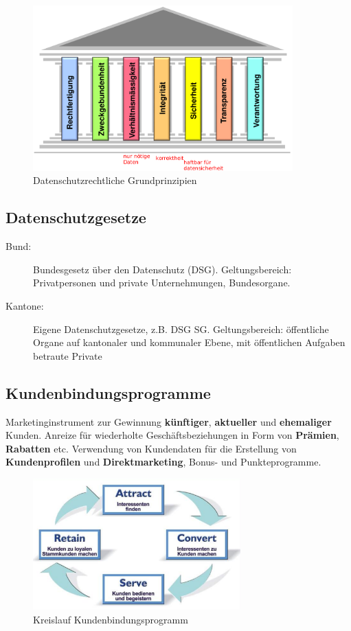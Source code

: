 \begin{figure}[H]
  \centering
  \includegraphics[width=10cm]{res/datenschutz-grundprinzipien.png}
  \caption{Datenschutzrechtliche Grundprinzipien}
\end{figure}

\subsection{Datenschutzgesetze}

\begin{description}
  \item[Bund:] Bundesgesetz über den Datenschutz (DSG). Geltungsbereich: Privatpersonen und private Unternehmungen, Bundesorgane.
  \item[Kantone:] Eigene Datenschutzgesetze, z.B. DSG SG. Geltungsbereich: öffentliche Organe auf kantonaler und kommunaler Ebene, mit öffentlichen Aufgaben betraute Private 
\end{description}

\subsection{Kundenbindungsprogramme}

Marketinginstrument zur Gewinnung \textbf{künftiger}, \textbf{aktueller} und \textbf{ehemaliger} Kunden. 
Anreize für wiederholte Geschäftsbeziehungen in Form von \textbf{Prämien}, \textbf{Rabatten} etc.
Verwendung von Kundendaten für die Erstellung von \textbf{Kundenprofilen} und \textbf{Direktmarketing}, Bonus- und Punkteprogramme.

\begin{figure}[H]
  \centering
  \includegraphics[width=8cm]{res/kundenbindung-kreislsauf.png}
  \caption{Kreislauf Kundenbindungsprogramm}
\end{figure}

